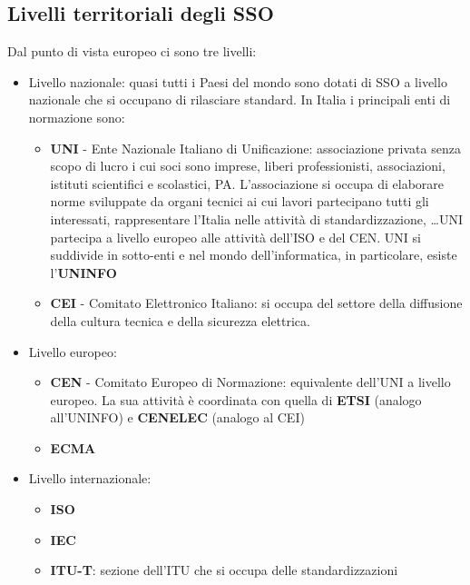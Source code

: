 \subsection{Livelli territoriali degli SSO}
Dal punto di vista europeo ci sono tre livelli:
\begin{itemize}
    \item Livello nazionale: quasi tutti i Paesi del mondo sono dotati di SSO a livello nazionale che si occupano di rilasciare standard. In Italia i principali enti di normazione sono:
        \begin{itemize}
            \item \textbf{UNI} - Ente Nazionale Italiano di Unificazione: associazione privata senza scopo di lucro i cui soci sono imprese, liberi professionisti, associazioni, istituti scientifici e scolastici, PA. L'associazione si occupa di elaborare norme sviluppate da organi tecnici ai cui lavori partecipano tutti gli interessati, rappresentare l'Italia nelle attività di standardizzazione, \dots \newline UNI partecipa a livello europeo alle attività dell'ISO e del CEN. 
            UNI si suddivide in sotto-enti e nel mondo dell'informatica, in particolare, esiste l'\textbf{UNINFO}
            \item \textbf{CEI} - Comitato Elettronico Italiano: si occupa del settore della diffusione della cultura tecnica e della sicurezza elettrica. 
        \end{itemize}
    \item Livello europeo:
        \begin{itemize}
            \item \textbf{CEN} - Comitato Europeo di Normazione: equivalente dell'UNI a livello europeo. La sua attività è coordinata con quella di \textbf{ETSI} (analogo all'UNINFO) e \textbf{CENELEC} (analogo al CEI)
            \item \textbf{ECMA}
        \end{itemize}
    \item Livello internazionale: 
        \begin{itemize}
            \item \textbf{ISO}
            \item \textbf{IEC}
            \item \textbf{ITU-T}: sezione dell'ITU che si occupa delle standardizzazioni
        \end{itemize}
\end{itemize}

